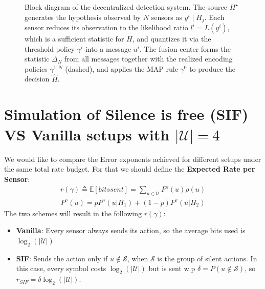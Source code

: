 \documentclass[11pt]{article}
\begin{document}
\begin{figure}[htbp]
{%
    }
\caption{Block diagram of the decentralized detection system. The source $H^\star$ generates the hypothesis observed by $N$ sensors as $y^i \mid H_j$. Each sensor reduces its observation to the likelihood ratio $l^i = L(y^i)$, which is a sufficient statistic for $H$, and quantizes it via the threshold policy $\gamma^i$ into a message $u^i$. The fusion center forms the statistic $\Delta_N$ from all messages together with the realized encoding policies $\gamma^{1:N}$ (dashed), and applies the MAP rule $\gamma^0$ to produce the decision $\hat{H}$.}
\label{fig:system-model}
\end{figure}

\newpage
\section*{Simulation of Silence is free (SIF) VS Vanilla setups with $|\mathcal{U}| =4$}
We would like to compare the Error exponents achieved for different setups under the same total rate budget. For that we should define the \textbf{Expected Rate per Sensor}:
\begin{align}
    r(\gamma) \triangleq \mathbb{E}[bits sent] = \sum_{u \in \mathcal{U}}P^{\gamma}(u)\rho(u)
\end{align}
\begin{align}
    P^\gamma(u) = pP^\gamma(u|H_1) + (1-p)P^\gamma(u|H_2)
\end{align}
The two schemes will result in the following $r(\gamma)$:
\begin{itemize}
    \item \textbf{Vanilla}: Every sensor always sends its action, so the average bits used is $\log_2(|\mathcal{U}|)$
    \item \textbf{SIF}: Sends the action only if $u \notin \mathcal{S}$, when $\mathcal{S}$ is the group of silent actions. In this case, every symbol costs $\log_2(|\mathcal{U}|)$ but is sent w.p $\delta = P(u \notin \mathcal{S})$, so $r_{SIF} = \delta \log_2(|\mathcal{U}|)$.
\end{itemize}
\end{document}
